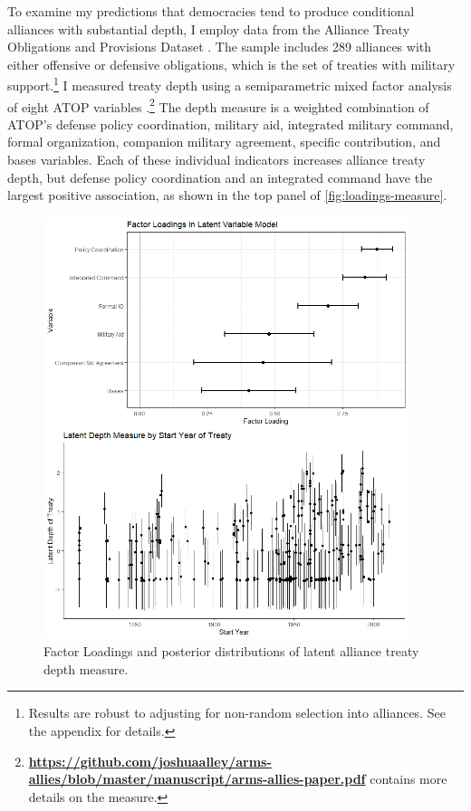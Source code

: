 \documentclass[12pt]{article}
\begin{document}
To examine my predictions that democracies tend to produce conditional alliances with substantial depth, I employ data from the Alliance Treaty Obligations and Provisions Dataset \citep{Leedsetal2002}. 
The sample includes 289 alliances with either offensive or defensive obligations, which is the set of treaties with military support.\footnote{Results are robust to adjusting for non-random selection into alliances. See the appendix for details.} 
I measured treaty depth using a semiparametric mixed factor analysis of eight ATOP variables \citep{Murrayetal2013}.\footnote{\textbf{\url{https://github.com/joshuaalley/arms-allies/blob/master/manuscript/arms-allies-paper.pdf}} contains more details on the measure.}
The depth measure is a weighted combination of ATOP's defense policy coordination, military aid, integrated military command, formal organization, companion military agreement, specific contribution, and bases variables. 
Each of these individual indicators increases alliance treaty depth, but defense policy coordination and an integrated command have the largest positive association, as shown in the top panel of \autoref{fig:loadings-measure}. 


\begin{figure}[hbtp]
\centering
\includegraphics[width=0.95\textwidth]{../figures/loadings-measure.png}
\caption{Factor Loadings and posterior distributions of latent alliance treaty depth measure.}
\label{fig:loadings-measure}
\end{figure}
\end{document}

